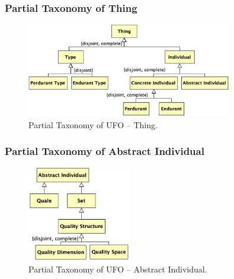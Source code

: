 \documentclass{article}
\newcommand{\BeginThingTaxonomy}{4}
\newcommand{\EndThingTaxonomy}{49}
\newcommand{\BeginAbstractIndividualTaxonomy}{51}
\newcommand{\EndAbstractIndividualTaxonomy}{86}
\begin{document}
\subsubsection{Partial Taxonomy of Thing}

\begin{figure}[ht]
    \centering
    \includegraphics[width=0.8\textwidth]{diagrams/Thing_Diagram.png}
    \caption{Partial Taxonomy of UFO -- Thing.}
    \label{fig:ufo_taxonomy_thing}
\end{figure}



\subsubsection{Partial Taxonomy of Abstract Individual}


\begin{figure}[ht]
    \centering
    \includegraphics[width=0.4\textwidth]{diagrams/Abstract_Individual_Diagram.png}
    \caption{Partial Taxonomy of UFO -- Abstract Individual.}
    \label{fig:ufo_taxonomy_abstract_individual}
\end{figure}


\end{document}
